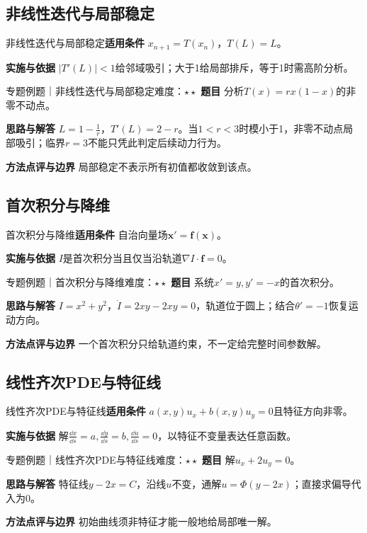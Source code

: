 \subsection{非线性迭代与局部稳定}\label{mat:difference_pde:nonlinear}
\begin{method}{非线性迭代与局部稳定}\textbf{适用条件} $x_{n+1}=T(x_n)$，$T(L)=L$。\par\textbf{实施与依据} $|T\prime(L)|<1$给邻域吸引；大于1给局部排斥，等于1时需高阶分析。\end{method}
\begin{example}{专题例题｜非线性迭代与局部稳定}{难度：$\star\star$}
\textbf{题目} 分析$T(x)=rx(1-x)$的非零不动点。\par\textbf{思路与解答} $L=1-\frac{1}{r}$，$T\prime(L)=2-r$。当$1<r<3$时模小于1，非零不动点局部吸引；临界$r=3$不能只凭此判定后续动力行为。\par\textbf{方法点评与边界} 局部稳定不表示所有初值都收敛到该点。
\end{example}
\subsection{首次积分与降维}\label{mat:difference_pde:firstintegral}
\begin{method}{首次积分与降维}\textbf{适用条件} 自治向量场$\bm x\prime=\bm f(\bm x)$。\par\textbf{实施与依据} $I$是首次积分当且仅当沿轨道$\nabla I\cdot\bm f=0$。\end{method}
\begin{example}{专题例题｜首次积分与降维}{难度：$\star\star$}
\textbf{题目} 系统$x\prime=y,y\prime=-x$的首次积分。\par\textbf{思路与解答} $I=x^2+y^2$，$\dot I=2xy-2xy=0$，轨道位于圆上；结合$\theta\prime=-1$恢复运动方向。\par\textbf{方法点评与边界} 一个首次积分只给轨道约束，不一定给完整时间参数解。
\end{example}
\subsection{线性齐次PDE与特征线}\label{mat:difference_pde:transport}
\begin{method}{线性齐次PDE与特征线}\textbf{适用条件} $a(x,y)u_x+b(x,y)u_y=0$且特征方向非零。\par\textbf{实施与依据} 解$\frac{\dd x}{\dd s}=a,\frac{\dd y}{\dd s}=b,\frac{\dd u}{\dd s}=0$，以特征不变量表达任意函数。\end{method}
\begin{example}{专题例题｜线性齐次PDE与特征线}{难度：$\star\star$}
\textbf{题目} 解$u_x+2u_y=0$。\par\textbf{思路与解答} 特征线$y-2x=C$，沿线$u$不变，通解$u=\Phi(y-2x)$；直接求偏导代入为0。\par\textbf{方法点评与边界} 初始曲线须非特征才能一般地给局部唯一解。
\end{example}
